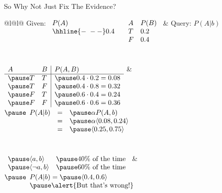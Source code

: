\documentclass[14pt]{beamer}
\begin{document}
\begin{frame}{So Why Not Just Fix The Evidence?}
	\begin{tabular}{@{}l@{\hspace{1.5em}}l@{}}
		Given:
		$
		\begin{array}[t]{llll}
			P(A) & & A & P(B) \\
			\hhline{-~--}
			0.4  & & T & 0.2 \\
			     & & F & 0.4 \\
		\end{array}
		$
		&
		Query: $P(A|b)$
		\\
		\\
		\\
		$
		\begin{array}[t]{ll|l}
			A & B & P(A,B) \\
			\hline
			\pause T & T & \pause 0.4 \cdot 0.2 = 0.08 \\
			\pause T & F & \pause 0.4 \cdot 0.8 = 0.32 \\
			\pause F & T & \pause 0.6 \cdot 0.4 = 0.24 \\
			\pause F & F & \pause 0.6 \cdot 0.6 = 0.36 \\
		\end{array}
		$
		&
		$
		\pause
		\begin{array}[t]{lll}
			P(A|b) & = & \pause \alpha P(A, b) \\
			       & = & \pause \alpha \langle 0.08, 0.24 \rangle \\
			       & = & \pause \langle 0.25, 0.75 \rangle
		\end{array}
		$
		\\
		\\
		\\
		$
		\begin{array}[t]{ll}
			\pause\langle a, b \rangle       & \pause\mbox{40\% of the time} \\
			\pause\langle \lnot a, b \rangle & \pause\mbox{60\% of the time} \\
		\end{array}
		$
		&
		$
		\pause
		\begin{array}[t]{l}
			P(A|b) = \pause\langle 0.4, 0.6 \rangle \\
			\pause\mbox{\alert{But that's wrong!}}
		\end{array}
		$
	\end{tabular}
\end{frame}
\end{document}
